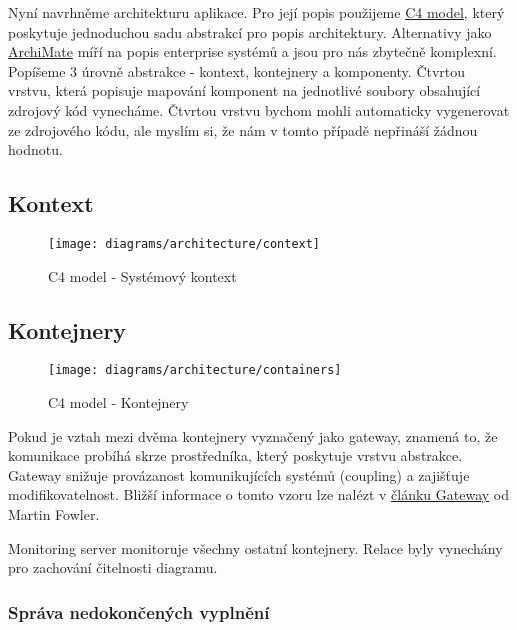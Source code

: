 Nyní navrhněme architekturu aplikace.
Pro její popis použijeme \href{https://c4model.com/}{C4 model}, který poskytuje jednoduchou sadu abstrakcí pro popis architektury.
Alternativy jako \href{https://www.opengroup.org/archimate-forum}{ArchiMate} míří na popis enterprise systémů a jsou pro nás zbytečně komplexní.
Popíšeme 3 úrovně abstrakce - kontext, kontejnery a komponenty.
Čtvrtou vrstvu, která popisuje mapování komponent na jednotlivé soubory obsahující zdrojový kód vynecháme.
Čtvrtou vrstvu bychom mohli automaticky vygenerovat ze zdrojového kódu, ale myslím si, že nám v tomto případě nepřináší žádnou hodnotu.

\subsection{Kontext}\label{subsec:kontext}

\begin{figure}[H]
    \texttt{[image: diagrams/architecture/context]}
    \caption{C4 model - Systémový kontext}\label{fig:architecture-context}
\end{figure}

\subsection{Kontejnery}\label{subsec:kontejnery}

\begin{figure}[H]
    \texttt{[image: diagrams/architecture/containers]}
    \caption{C4 model - Kontejnery}\label{fig:architecture-containers}
\end{figure}

\begin{tcolorbox}
    Pokud je vztah mezi dvěma kontejnery vyznačený jako gateway, znamená to, že komunikace probíhá skrze prostředníka, který poskytuje vrstvu abstrakce.
    Gateway snižuje provázanost komunikujících systémů (coupling) a zajišťuje modifikovatelnost.
    Bližší informace o tomto vzoru lze nalézt v \href{https://martinfowler.com/articles/gateway-pattern.html}{článku Gateway} od Martin Fowler.
\end{tcolorbox}

\begin{tcolorbox}
    Monitoring server monitoruje všechny ostatní kontejnery.
    Relace byly vynechány pro zachování čitelnosti diagramu.
\end{tcolorbox}

\subsubsection{Správa nedokončených vyplnění}\label{subsubsec:sprava-nedokoncenych-vyplneni}

